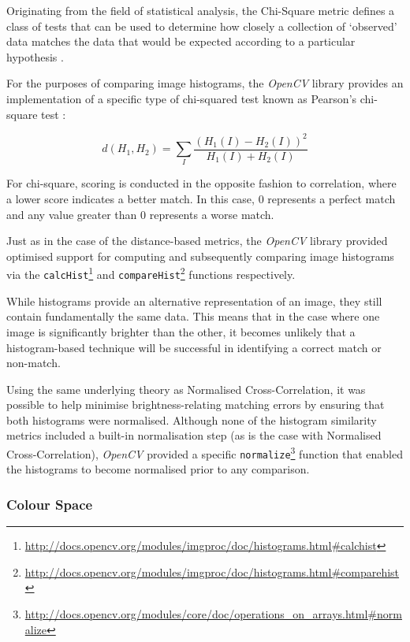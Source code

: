 Originating from the field of statistical analysis, the Chi-Square metric defines a class of tests that can be used to determine how closely a collection of `observed' data matches the data that would be expected according to a particular hypothesis \cite{mclaughlin}. 

For the purposes of comparing image histograms, the \textit{OpenCV} library provides an implementation of a specific type of chi-squared test known as Pearson's chi-square test \cite{bradski2008learning}:

\begin{equation}
d(H_{1}, H_{2}) = \sum\limits_{I}\frac{(H_{1}(I) - H_{2}(I))^2}{H_{1}(I) + H_{2}(I)}
\end{equation}

For chi-square, scoring is conducted in the opposite fashion to correlation, where a lower score indicates a better match. In this case, 0 represents a perfect match and any value greater than 0 represents a worse match.

Just as in the case of the distance-based metrics, the \textit{OpenCV} library provided optimised support for computing and subsequently comparing image histograms via the \texttt{calcHist}\footnote{\url{http://docs.opencv.org/modules/imgproc/doc/histograms.html#calchist}} and \texttt{compareHist}\footnote{\url{http://docs.opencv.org/modules/imgproc/doc/histograms.html#comparehist}} functions respectively. 

While histograms provide an alternative representation of an image, they still contain fundamentally the same data. This means that in the case where one image is significantly brighter than the other, it becomes unlikely that a histogram-based technique will be successful in identifying a correct match or non-match. 

Using the same underlying theory as Normalised Cross-Correlation, it was possible to help minimise brightness-relating matching errors by ensuring that both histograms were normalised. Although none of the histogram similarity metrics included a built-in normalisation step (as is the case with Normalised Cross-Correlation), \textit{OpenCV} provided a specific \texttt{normalize}\footnote{\url{http://docs.opencv.org/modules/core/doc/operations_on_arrays.html#normalize}} function that enabled the histograms to become normalised prior to any comparison.

\subsubsection{Colour Space}

